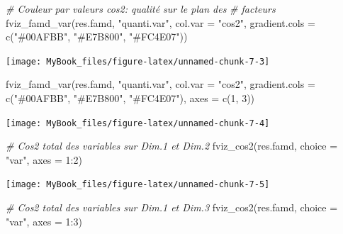 \documentclass[
  12pt,
  american,
  a4paper,
  extrafontsizes,onecolumn,openright
  ]{memoir}
\newenvironment{Shaded}{\begin{snugshade}}{\end{snugshade}}
\newcommand{\AttributeTok}[1]{\textcolor[rgb]{0.77,0.63,0.00}{#1}}
\newcommand{\CommentTok}[1]{\textcolor[rgb]{0.56,0.35,0.01}{\textit{#1}}}
\newcommand{\DecValTok}[1]{\textcolor[rgb]{0.00,0.00,0.81}{#1}}
\newcommand{\FunctionTok}[1]{\textcolor[rgb]{0.00,0.00,0.00}{#1}}
\newcommand{\NormalTok}[1]{#1}
\newcommand{\SpecialCharTok}[1]{\textcolor[rgb]{0.00,0.00,0.00}{#1}}
\newcommand{\StringTok}[1]{\textcolor[rgb]{0.31,0.60,0.02}{#1}}
\begin{document}
\begin{Shaded}
\begin{Highlighting}[]
\CommentTok{\# Couleur par valeurs cos2: qualité sur le plan des}
\CommentTok{\# facteurs}
\FunctionTok{fviz\_famd\_var}\NormalTok{(res.famd, }\StringTok{"quanti.var"}\NormalTok{, }\AttributeTok{col.var =} \StringTok{"cos2"}\NormalTok{, }\AttributeTok{gradient.cols =} \FunctionTok{c}\NormalTok{(}\StringTok{"\#00AFBB"}\NormalTok{,}
    \StringTok{"\#E7B800"}\NormalTok{, }\StringTok{"\#FC4E07"}\NormalTok{))}
\end{Highlighting}
\end{Shaded}

\begin{center}\texttt{[image: MyBook\_files/figure-latex/unnamed-chunk-7-3]} \end{center}

\begin{Shaded}
\begin{Highlighting}[]
\FunctionTok{fviz\_famd\_var}\NormalTok{(res.famd, }\StringTok{"quanti.var"}\NormalTok{, }\AttributeTok{col.var =} \StringTok{"cos2"}\NormalTok{, }\AttributeTok{gradient.cols =} \FunctionTok{c}\NormalTok{(}\StringTok{"\#00AFBB"}\NormalTok{,}
    \StringTok{"\#E7B800"}\NormalTok{, }\StringTok{"\#FC4E07"}\NormalTok{), }\AttributeTok{axes =} \FunctionTok{c}\NormalTok{(}\DecValTok{1}\NormalTok{, }\DecValTok{3}\NormalTok{))}
\end{Highlighting}
\end{Shaded}

\begin{center}\texttt{[image: MyBook\_files/figure-latex/unnamed-chunk-7-4]} \end{center}

\begin{Shaded}
\begin{Highlighting}[]
\CommentTok{\# Cos2 total des variables sur Dim.1 et Dim.2}
\FunctionTok{fviz\_cos2}\NormalTok{(res.famd, }\AttributeTok{choice =} \StringTok{"var"}\NormalTok{, }\AttributeTok{axes =} \DecValTok{1}\SpecialCharTok{:}\DecValTok{2}\NormalTok{)}
\end{Highlighting}
\end{Shaded}

\begin{center}\texttt{[image: MyBook\_files/figure-latex/unnamed-chunk-7-5]} \end{center}

\begin{Shaded}
\begin{Highlighting}[]
\CommentTok{\# Cos2 total des variables sur Dim.1 et Dim.3}
\FunctionTok{fviz\_cos2}\NormalTok{(res.famd, }\AttributeTok{choice =} \StringTok{"var"}\NormalTok{, }\AttributeTok{axes =} \DecValTok{1}\SpecialCharTok{:}\DecValTok{3}\NormalTok{)}
\end{Highlighting}
\end{Shaded}
\end{document}
